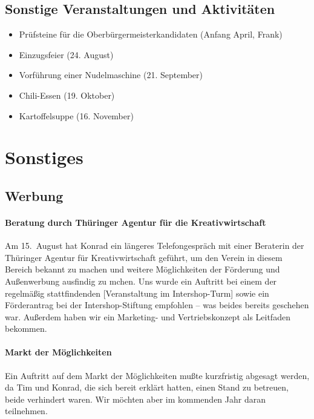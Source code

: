 \documentclass[10pt,DIV16]{scrartcl}
\begin{document}
\subsection{Sonstige Veranstaltungen und Aktivitäten}

\begin{itemize}
	\item Prüfsteine für die Oberbürgermeisterkandidaten (Anfang April, Frank)
	\item Einzugsfeier (24. August)
	\item Vorführung einer Nudelmaschine (21. September)
	\item Chili-Essen (19. Oktober)
	\item Kartoffelsuppe (16. November)
\end{itemize}



\section{Sonstiges}

\subsection{Werbung}

\paragraph{Beratung durch Thüringer Agentur für die Kreativwirtschaft}

Am 15.~August hat Konrad ein längeres Telefongespräch mit einer Beraterin der
Thüringer Agentur für Kreativwirtschaft geführt, um den Verein in diesem
Bereich bekannt zu machen und weitere Möglichkeiten der Förderung und
Außenwerbung ausfindig zu mchen.  Uns wurde ein Auftritt bei einem der
regelmäßig stattfindenden [Veranstaltung im Intershop-Turm] sowie ein
Förderantrag bei der Intershop-Stiftung empfohlen -- was beides bereits
geschehen war.  Außerdem haben wir ein Marketing- und Vertriebskonzept als
Leitfaden bekommen.

\paragraph{Markt der Möglichkeiten}

Ein Auftritt auf dem Markt der Möglichkeiten mußte kurzfristig abgesagt
werden, da Tim und Konrad, die sich bereit erklärt hatten, einen Stand zu
betreuen, beide verhindert waren.  Wir möchten aber im kommenden Jahr daran
teilnehmen.
\end{document}
